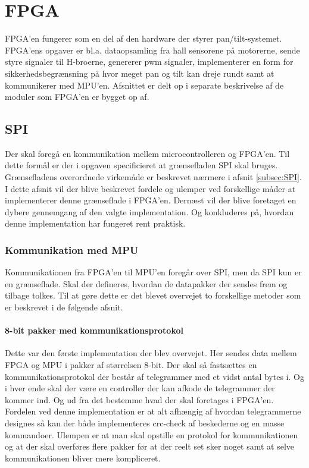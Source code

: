\section{FPGA}
FPGA'en fungerer som en del af den hardware der styrer pan/tilt-systemet. FPGA'ens opgaver er bl.a. dataopsamling fra hall sensorene på motorerne, sende styre signaler til H-broerne, genererer pwm signaler, implementerer en form for sikkerhedsbegrænsning på hvor meget pan og tilt kan dreje rundt samt at kommunikerer med MPU'en. Afsnittet er delt op i separate beskrivelse af de moduler som FPGA'en er bygget op af. \\

\subsection{SPI}
Der skal foregå en kommunikation mellem microcontrolleren og FPGA'en. Til dette formål er der i opgaven specificieret at grænsefladen SPI skal bruges. Grænsefladens overordnede virkemåde er beskrevet nærmere i afsnit \ref{subsec:SPI}. I dette afsnit vil der blive beskrevet fordele og ulemper ved forskellige måder at implementerer denne grænseflade i FPGA'en. Dernæst vil der blive foretaget en dybere gennemgang af den valgte implementation. Og konkluderes på, hvordan denne implementation har fungeret rent praktisk.

\subsubsection{Kommunikation med MPU}
Kommunikationen fra FPGA'en til MPU'en foregår over SPI, men da SPI kun er en grænseflade. Skal der defineres, hvordan de datapakker der sendes frem og tilbage tolkes. Til at gøre dette er det blevet overvejet to forskellige metoder som er beskrevet i de følgende afsnit.

\paragraph*{8-bit pakker med kommunikationsprotokol}
Dette var den første implementation der blev overvejet. Her sendes data mellem FPGA og MPU i pakker af størrelsen 8-bit. Der skal så fastsættes en kommunikationsprotokol der består af telegrammer med et vidst antal bytes i. Og i hver ende skal der være en controller der kan afkode de telegrammer der kommer ind. Og ud fra det bestemme hvad der skal foretages i FPGA'en. Fordelen ved denne implementation er at alt afhængig af hvordan telegrammerne designes så kan der både implementeres crc-check af beskederne og en masse kommandoer. Ulempen er at man skal opstille en protokol for kommunikationen og at der skal overføres flere pakker før at der reelt set sker noget samt at selve kommunikationen bliver mere kompliceret.

